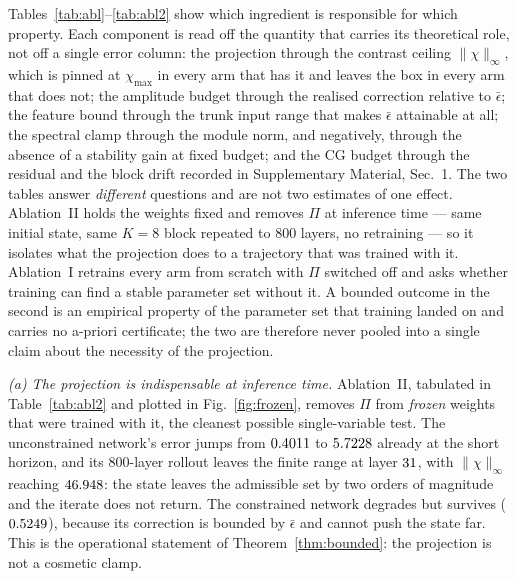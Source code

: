 \documentclass[journal,cmes,article,submit,moreauthors,pdftex]{Definitions/tsp}
\newcommand{\infn}[1]{\lVert #1 \rVert_{\infty}}
\newcommand{\numv}[1]{#1}
\begin{document}
\noindent
Tables~\ref{tab:abl}--\ref{tab:abl2} show which ingredient is responsible for which property.
Each component is read off the quantity that carries its theoretical role, not off a single error
column: the projection through the contrast ceiling $\infn{\chi}$, which is pinned at $\chi_{\max}$
in every arm that has it and leaves the box in every arm that does not; the amplitude budget
through the realised correction relative to $\bar\epsilon$; the feature bound through the trunk
input range that makes $\bar\epsilon$ attainable at all; the spectral clamp through the module
norm, and negatively, through the absence of a stability gain at fixed budget; and the CG budget
through the residual and the block drift recorded in Supplementary Material, Sec.~1.
The two tables answer \emph{different} questions and are not two estimates of one effect.
Ablation~II holds the weights fixed and removes $\Pi$ at inference time --- same initial state,
same $K{=}8$ block repeated to $800$ layers, no retraining --- so it isolates what the projection
does to a trajectory that was trained with it. Ablation~I retrains every arm from scratch with
$\Pi$ switched off and asks whether training can find a stable parameter set without it. A bounded
outcome in the second is an empirical property of the parameter set that training landed on and
carries no a-priori certificate; the two are therefore never pooled into a single claim about the
necessity of the projection.

\emph{(a) The projection is indispensable at inference time.} Ablation~II, tabulated in Table~\ref{tab:abl2} and plotted in Fig.~\ref{fig:frozen}, removes $\Pi$ from \emph{frozen} weights that were
trained with it, the cleanest possible single-variable test. The
unconstrained network's error jumps from $\numv{\NumFrzUncOn}$ to
$\numv{\NumFrzUncOffShort}$ already at the short horizon, and its $800$-layer rollout leaves the
finite range at layer $\numv{\NumFrzUncBreak}$, with $\infn{\chi}$ reaching
$\numv{\NumFrzUncOffChi}$: the state leaves the admissible set by two orders of magnitude and the
iterate does not return. The constrained network
degrades but survives ($\numv{\NumFrzConsOff}$), because its correction is bounded by
$\bar\epsilon$ and cannot push the state far. This is the operational statement of
Theorem~\ref{thm:bounded}: the projection is not a cosmetic clamp.
\end{document}
